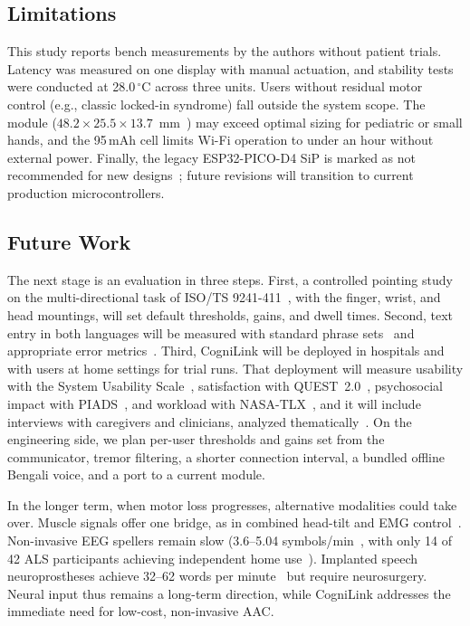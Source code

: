 \documentclass[journal]{IEEEtran}
\newcommand{\degC}{\ensuremath{^{\circ}}C}
\begin{document}
\subsection{Limitations}
This study reports bench measurements by the authors without patient trials. Latency was measured on one display with manual actuation, and stability tests were conducted at 28.0\,\degC{} across three units. Users without residual motor control (e.g., classic locked-in syndrome) fall outside the system scope. The module ($48.2\times25.5\times13.7$~mm~\cite{m5stickc}) may exceed optimal sizing for pediatric or small hands, and the 95\,mAh cell limits Wi-Fi operation to under an hour without external power. Finally, the legacy ESP32-PICO-D4 SiP is marked as not recommended for new designs~\cite{esp32picoseries}; future revisions will transition to current production microcontrollers.

\subsection{Future Work}
The next stage is an evaluation in three steps. First, a controlled pointing study on the multi-directional task of ISO/TS 9241-411~\cite{iso2012,douglas1999}, with the finger, wrist, and head mountings, will set default thresholds, gains, and dwell times. Second, text entry in both languages will be measured with standard phrase sets~\cite{mackenzie2003,arif2016} and appropriate error metrics~\cite{soukoreff2003,sarcar2015}. Third, CogniLink will be deployed in hospitals and with users at home settings for trial runs. That deployment will measure usability with the System Usability Scale~\cite{brooke1996}, satisfaction with QUEST~2.0~\cite{demers2002}, psychosocial impact with PIADS~\cite{day1996}, and workload with NASA-TLX~\cite{hart1988}, and it will include interviews with caregivers and clinicians, analyzed thematically~\cite{braun2006}. On the engineering side, we plan per-user thresholds and gains set from the communicator, tremor filtering, a shorter connection interval, a bundled offline Bengali voice, and a port to a current module.

In the longer term, when motor loss progresses, alternative modalities could take over. Muscle signals offer one bridge, as in combined head-tilt and EMG control~\cite{vojtech2020}. Non-invasive EEG spellers remain slow (3.6--5.04 symbols/min~\cite{guy2018}, with only 14 of 42 ALS participants achieving independent home use~\cite{wolpaw2018}). Implanted speech neuroprostheses achieve 32--62 words per minute~\cite{willett2023,card2024} but require neurosurgery. Neural input thus remains a long-term direction, while CogniLink addresses the immediate need for low-cost, non-invasive AAC.
\end{document}
